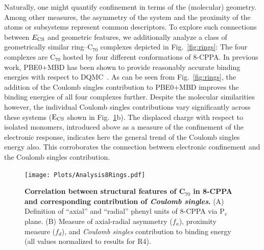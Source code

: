 \documentclass[aps,prl,groupaddress, twocolumn]{revtex4-1}  %
\begin{document}
 Naturally, one might quantify confinement in terms of the (molecular) geometry. Among other measures, the asymmetry of the system and the proximity of the atoms or subsystems represent common descriptors. To explore such connections between $E_{\rm CS}$ and geometric features, we additionally analyze a class of geometrically similar ring--C$_{70}$ complexes depicted in Fig.~\ref{fig:rings}: The four complexes are C$_{70}$ hosted by four different conformations of 8-CPPA.
In previous work, PBE0+MBD has been shown to provide reasonably accurate binding energies with respect to DQMC~\cite{hermann_ncomm2017}. As can be seen from Fig.~\ref{fig:rings}, the addition of the Coulomb singles contribution to PBE0+MBD improves the binding energies of all four complexes further. Despite the molecular similarities however, the individual Coulomb singles contributions vary significantly across these systems ($\rm E_{CS}$ shown in Fig.~\ref{fig:analysis_rings}b). The displaced charge with respect to isolated monomers, introduced above as a measure of the confinement of the electronic response, indicates here the general trend of the Coulomb singles energy also. This corroborates the connection between electronic confinement and the Coulomb singles contribution.

\begin{figure}[htp]
\texttt{[image: Plots/Analysis8Rings.pdf]}
\caption{\textbf{Correlation between structural features of C$_{70}$ in 8-CPPA and corresponding contribution of \emph{Coulomb singles}.} (A) Definition of ``axial'' and ``radial'' phenyl units of 8-CPPA via P$_v$ plane. (B) Measure of axial-radial asymmetry ($f_a$), proximity measure ($f_d$), and \emph{Coulomb singles} contribution to binding energy (all values normalized to results for R4).}\label{fig:analysis_rings}
\end{figure}
\end{document}
